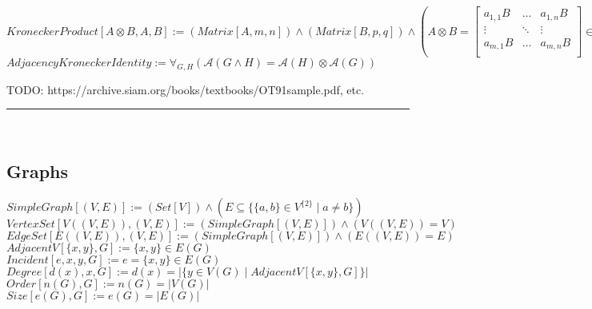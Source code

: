 \documentclass{book}
\newcommand{\abr}{:=}
\newcommand{\st}{\mathbin{|}}
\newcommand{\utup}[1]{\{#1\}}
\newcommand{\notation}[2]{\fbox{{[Notation] \phantom{-} $#1 \abr #2$}}}
\begin{document}
$KroneckerProduct[A \otimes B, A, B] \abr (Matrix[A, m, n]) \land (Matrix[B, p, q]) \land (A \otimes B =
\begin{bmatrix}
  a_{1,1} B & \dots & a_{1, n} B \\
  \vdots & \ddots & \vdots \\
  a_{m, 1} B & \dots & a_{m, n} B \\
\end{bmatrix} \in \mathbb{R}^{m p} \times \mathbb{R}^{n q})$ \\

$AdjacencyKroneckerIdentity \abr \forall_{G, H}(\mathcal{A}(G \land H) = \mathcal{A}(H) \otimes \mathcal{A}(G))$
\begin{enumerate}
  \lit TODO: https://archive.siam.org/books/textbooks/OT91sample.pdf, etc.
\end{enumerate} \vspace{.75mm} \hrule \vspace{.75mm} \ \\


\subsection{Graphs}
$SimpleGraph[(V, E)] \abr (Set[V]) \land (E \subseteq \{\utup{a, b} \in V^{\{2\}} \st a \neq b\})$ \\
$VertexSet[V((V, E)), (V, E)] \abr (SimpleGraph[(V, E)]) \land (V((V, E)) = V)$ \\
$EdgeSet[E((V, E)), (V, E)] \abr (SimpleGraph[(V, E)]) \land (E((V, E)) = E)$ \\
$AdjacentV[\utup{x, y}, G] \abr \utup{x, y} \in E(G)$ \\ %
$Incident[e, x, y, G] \abr e = \utup{x, y} \in E(G)$ \\
$Degree[d(x), x, G] \abr d(x) = |\{y \in V(G) \st AdjacentV[\utup{x, y}, G]\}|$ \\
$Order[n(G), G] \abr n(G) = |V(G)|$ \\
$Size[e(G), G] \abr e(G) = |E(G)|$ \\
\end{document}
